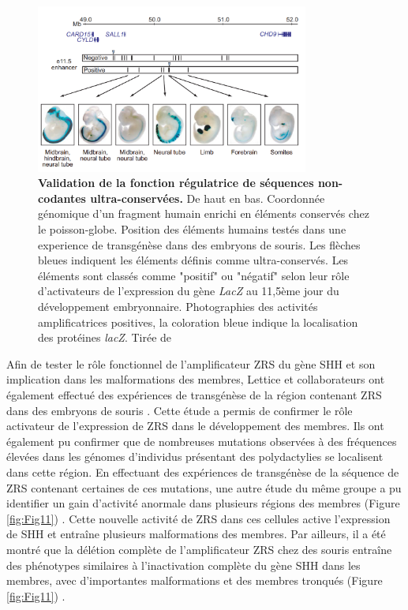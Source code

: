 \begin{figure}[h]
 \centering
 \includegraphics[width=0.8\textwidth, page=1] {figures/introduction/fig10.png}
 \caption[Validation de la fonction régulatrice de séquences non-codantes ultra-conservées.]{
 \textbf{Validation de la fonction régulatrice de séquences non-codantes ultra-conservées.} De haut en bas. Coordonnée génomique d'un fragment humain enrichi en éléments conservés chez le poisson-globe. Position des éléments humains testés dans une experience de transgénèse dans des embryons de souris. Les flèches bleues indiquent les éléments définis comme ultra-conservés. Les éléments sont classés comme "positif" ou "négatif" selon leur rôle d'activateurs de l'expression du gène \textit{LacZ} au 11,5ème jour du développement embryonnaire. Photographies des activités amplificatrices positives, la coloration bleue indique la localisation des protéines \textit{lacZ}. Tirée de \citet{pennacchio_vivo_2006}\\
 }
 \label{fig:Fig10}
\end{figure}

Afin de tester le rôle fonctionnel de l’\gls{amplificateur} \acrshort{ZRS} du gène \acrshort{SHH} et son implication dans les malformations des membres, Lettice et collaborateurs ont également effectué des expériences de transgénèse de la région contenant \acrshort{ZRS} dans des embryons de souris \citep{lettice_long-range_2003}. Cette étude a permis de confirmer le rôle activateur de l’expression de \acrshort{ZRS} dans le développement des membres. Ils ont également pu confirmer que de nombreuses mutations observées à des fréquences élevées dans les génomes d’individus présentant des polydactylies se localisent dans cette région. En effectuant des expériences de transgénèse de la séquence de \acrshort{ZRS} contenant certaines de ces mutations, une autre étude du même groupe a pu identifier un gain d’activité anormale dans plusieurs régions des membres (Figure \ref{fig:Fig11}) \citep{lettice_point_2008}. Cette nouvelle activité de \acrshort{ZRS} dans ces cellules active l’expression de \acrshort{SHH} et entraîne plusieurs malformations des membres. Par ailleurs, il a été montré que la délétion complète de l’\gls{amplificateur} \acrshort{ZRS} chez des souris entraîne des phénotypes similaires à l’inactivation complète du gène \acrshort{SHH} dans les membres, avec d’importantes malformations et des membres tronqués (Figure \ref{fig:Fig11}) \citep{sagai_elimination_2005}. 

